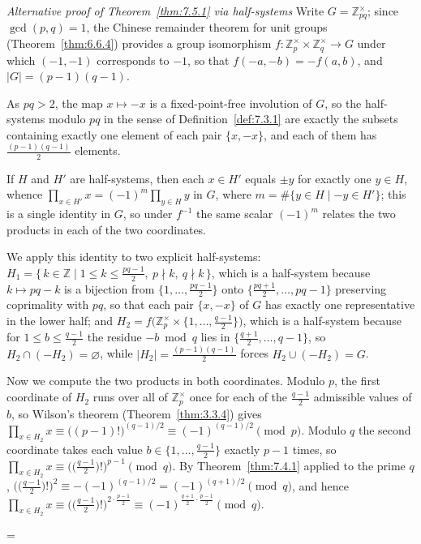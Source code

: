 \documentclass[11pt]{article}
\makeatletter
\theoremstyle{ntstyle}
\let\nt@closedisplay\]
\def\nt@guardedclose{\@ifnextchar\par{\nt@closeafterpar}{\@ifnextchar\end{\postdisplaypenalty\@M\nt@closedisplay}{\nt@closedisplay}}}
\def\nt@closeafterpar\par{\@ifnextchar\par{\nt@closeafterpar}{\@ifnextchar\end{\postdisplaypenalty\@M\nt@closedisplay\par}{\nt@closedisplay\par}}}
\renewenvironment{proof}[1][\proofname]{\par
  \pushQED{\qed}\normalfont\topsep\medskipamount\edef\nt@afterproof{\@endparpenalty=\the\@endparpenalty\relax}\@beginparpenalty\@M\@endparpenalty\@M\let\]\nt@guardedclose\trivlist\item[]\textit{#1\@addpunct{.}} \ignorespaces}{\ifvmode\addpenalty\@M\fi\popQED\nt@afterproof\endtrivlist\@endpefalse}
\newenvironment{altproof}[1][\proofname]{\begin{proof}[#1]}{\end{proof}}
\newcommand{\ZmodUnits}[1]{\mathbb{Z}_{#1}^{\times}}
\makeatother
\begin{document}
\begin{altproof}[Alternative proof of Theorem~\ref{thm:7.5.1} via half-systems] Write $G =
\ZmodUnits{pq}$; since $\gcd(p, q)
		= 1$, the Chinese remainder theorem for unit groups (Theorem~\ref{thm:6.6.4}) provides a group
	isomorphism $f : \ZmodUnits{p} \times \ZmodUnits{q}
		\to G$ under which $(-1, -1)$ corresponds to $-1$, so that $f(-a, -b)
		= -f(a, b)$, and $|G| = (p-1)(q-1)$.

	As $pq > 2$, the map $x \mapsto
		-x$ is a fixed-point-free involution of $G$, so the half-systems modulo
	$pq$ in the sense of Definition~\ref{def:7.3.1} are exactly the subsets containing
	exactly one element of each pair $\{x, -x\}$, and each of them has
	$\tfrac{(p-1)(q-1)}{2}$ elements.

	If $H$ and $H'$
	are half-systems, then each $x \in H'$ equals $\pm y$ for exactly one
	$y \in H$, whence $\prod_{x \in H'} x = (-1)^{m} \prod_{y \in H} y$ in
	$G$, where $m = \#\{y \in H \mid -y \in H'\}$; this is a single
	identity in $G$, so under $f^{-1}$ the same scalar $(-1)^{m}$ relates
	the two products in each of the two coordinates.

	We apply this identity to two explicit
	half-systems: $H_1 = \{\, k \in \mathbb{Z} \mid 1 \le k \le
		\tfrac{pq-1}{2},\ p \nmid k,\ q \nmid k \,\}$, which is a half-system
	because $k \mapsto pq - k$ is a bijection from $\{1, \ldots,
		\tfrac{pq-1}{2}\}$ onto $\{\tfrac{pq+1}{2}, \ldots, pq-1\}$
	preserving coprimality with $pq$, so that each pair $\{x, -x\}$ of $G$
	has exactly one representative in the lower half; and $H_2 =
		f\big(\ZmodUnits{p} \times \{1, \ldots,
		\tfrac{q-1}{2}\}\big)$, which is a half-system because for $1 \le b
		\le \tfrac{q-1}{2}$ the residue $-b \bmod q$ lies in
	$\{\tfrac{q+1}{2}, \ldots, q-1\}$, so $H_2 \cap (-H_2) = \varnothing$,
	while $|H_2| = \tfrac{(p-1)(q-1)}{2}$ forces $H_2 \cup (-H_2) = G$.

	Now we compute the two products in both coordinates. Modulo $p$, the
	first coordinate of $H_2$ runs over all of $\ZmodUnits{p}$
	once for each of the $\tfrac{q-1}{2}$ admissible values of $b$, so
	Wilson's theorem (Theorem~\ref{thm:3.3.4}) gives $\prod_{x \in H_2} x \equiv
		\big((p-1)!\big)^{(q-1)/2} \equiv (-1)^{(q-1)/2} \pmod{p}$. Modulo $q$
	the second coordinate takes each value $b \in \{1, \ldots,
		\tfrac{q-1}{2}\}$ exactly $p-1$ times, so $\prod_{x \in H_2} x \equiv
		\big(\big(\tfrac{q-1}{2}\big)!\big)^{p-1} \pmod{q}$. By
	Theorem~\ref{thm:7.4.1} applied to the prime $q$,
	$\big(\big(\tfrac{q-1}{2}\big)!\big)^{2} \equiv -(-1)^{(q-1)/2} = (-1)^{(q+1)/2}
		\pmod{q}$, and hence $\prod_{x \in H_2} x \equiv
		\big(\big(\tfrac{q-1}{2}\big)!\big)^{2 \cdot \frac{p-1}{2}} \equiv
		(-1)^{\frac{q+1}{2}\cdot\frac{p-1}{2}} \pmod{q}$.


\end{altproof}
\end{document}
